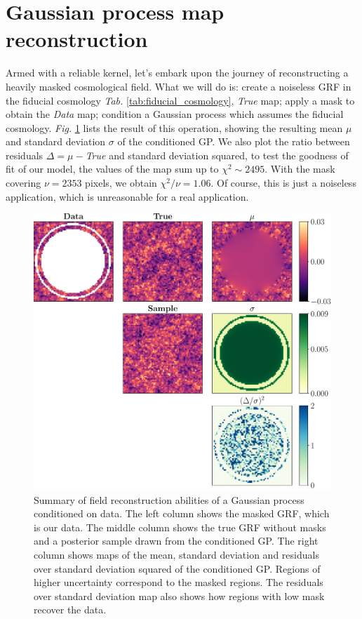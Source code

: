 \section{Gaussian process map reconstruction}
\label{sec:gaussian process map reconstruction}
Armed with a reliable kernel, let's embark upon the journey of reconstructing a heavily masked cosmological field. What we will do is: create a noiseless GRF in the fiducial cosmology \textit{Tab. }\ref{tab:fiducial_cosmology}, \textit{True} map; apply a mask to obtain the \textit{Data} map; condition a Gaussian process which assumes the fiducial cosmology. \textit{Fig. }\ref{fig:GP reconstruction summary} lists the result of this operation, showing the resulting mean $\mu$ and standard deviation $\sigma$ of the conditioned GP. We also plot the ratio between residuals $\Delta=\mu-$\textit{True} and standard deviation squared, to test the goodness of fit of our model, the values of the map sum up to $\chi^2 \sim 2495$. With the mask covering $\nu=2353$ pixels, we obtain $\chi^2 / \nu = 1.06$. Of course, this is just a noiseless application, which is unreasonable for a real application.
\begin{figure}[h]
    \centering
    \includegraphics[width=\textwidth]{images/2_summary.pdf}
    \caption{\label{fig:GP reconstruction summary}Summary of field reconstruction abilities of a Gaussian process conditioned on data. The left column shows the masked GRF, which is our data. The middle column shows the true GRF without masks and a posterior sample drawn from the conditioned GP. The right column shows maps of the mean, standard deviation and residuals over standard deviation squared of the conditioned GP. Regions of higher uncertainty correspond to the masked regions. The residuals over standard deviation map also shows how regions with low mask recover the data.}
\end{figure}

